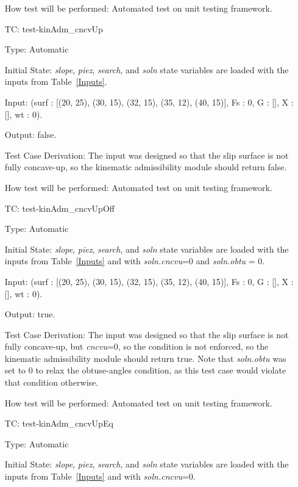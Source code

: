 \documentclass[12pt, titlepage]{article}
\newcounter{utestnum} %
\begin{document}
\begin{enumerate}[label=TC\arabic*:,ref={\arabic*}]
	How test will be performed: Automated test on unit testing framework.
	
	\item [TC\refstepcounter{utestnum}\theutestnum: \label{TC_KinAdmCncvUp}] 
	test-kinAdm\_cncvUp
	
	Type: Automatic
	
	Initial State: \textit{slope}, \textit{piez}, \textit{search}, and 
	\textit{soln} state variables are loaded with the inputs from 
	Table~\ref{Inputs}.
	
	Input: (surf : [(20, 25), (30, 15), (32, 15), (35, 12), (40, 15)], Fs : 0, 
	G : [], X : [], wt : 0).
	
	Output: false.
	
	Test Case Derivation: The input was designed so that the slip surface is 
	not fully concave-up, so the kinematic admissibility module should return 
	false.
	
	How test will be performed: Automated test on unit testing framework.
	
	\item [TC\refstepcounter{utestnum}\theutestnum: \label{TC_KinAdmCncvUpOff}] 
	test-kinAdm\_cncvUpOff
	
	Type: Automatic
	
	Initial State: \textit{slope}, \textit{piez}, \textit{search}, and 
	\textit{soln} state variables are loaded with the inputs from 
	Table~\ref{Inputs} and with \textit{soln.cncvu}=0 and \textit{soln.obtu} = 
	0.
	
	Input: (surf : [(20, 25), (30, 15), (32, 15), (35, 12), (40, 15)], Fs : 0, 
	G : [], X : [], wt : 0).
	
	Output: true.
	
	Test Case Derivation: The input was designed so that the slip surface is 
	not fully concave-up, but \textit{cncvu}=0, so the condition is not 
	enforced, so the kinematic admissibility module should return true. Note 
	that \textit{soln.obtu} was set to 0 to relax the obtuse-angles condition, 
	as this test case would violate that condition otherwise.
	
	How test will be performed: Automated test on unit testing framework.
	
	\item [TC\refstepcounter{utestnum}\theutestnum: \label{TC_KinAdmCncvUpEq}] 
	test-kinAdm\_cncvUpEq
	
	Type: Automatic
	
	Initial State: \textit{slope}, \textit{piez}, \textit{search}, and 
	\textit{soln} state variables are loaded with the inputs from 
	Table~\ref{Inputs} and with \textit{soln.cncvu}=0.
	

\end{enumerate}
\end{document}
